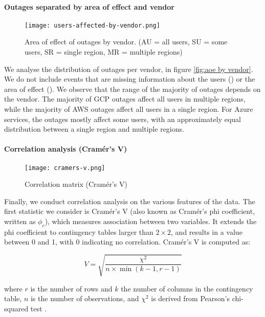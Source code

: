 \paragraph{Outages separated by area of effect and vendor}
\begin{figure}
  \centering
  \texttt{[image: users-affected-by-vendor.png]}
  \caption{Area of effect of outages by vendor. (AU = all users, SU = some users, SR = single region, MR = multiple regions)}
  \label{fig:aoe by vendor}
\end{figure}

We analyse the distribution of outages per vendor, in figure \autoref{fig:aoe by vendor}.
We do not include events that are missing information about the users () or the area of effect ().
We observe that the range of the majority of outages depends on the vendor.
The majority of GCP outages affect all users in multiple regions, while the majority of AWS outages affect all users in a single region.
For Azure services, the outages mostly affect some users, with an approximately equal distribution between a single region and multiple regions.

\clearpage

\paragraph{Correlation analysis (Cram\'{e}r's V)}
\begin{figure}
  \centering
  \texttt{[image: cramers-v.png]}
  \caption{Correlation matrix (Cram\'{e}r's V)}
  \label{fig:cramers v}
\end{figure}

Finally, we conduct correlation analysis on the various features of the data.
The first statistic we consider is Cram\'{e}r's V (also known as Cram\'{e}r's phi coefficient, written as $\phi_c$), which measures association between two variables.
It extends the phi coefficient to contingency tables larger than $2 \times 2$, and results in a value between 0 and 1, with 0 indicating no correlation.
Cram\'{e}r's V is computed as:

$$
V = \sqrt{\frac{\chi^2}{n \times \min{(k-1, r-1)}}}
$$

where $r$ is the number of rows and $k$ the number of columns in the contingency table, $n$ is the number of observations, and $\chi^2$ is derived from Pearson's chi-squared test \cite{holmes1998}.

